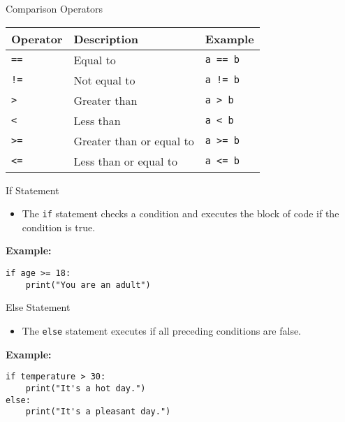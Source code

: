 \documentclass[serif, aspectratio=169]{beamer}
\begin{document}
\begin{frame}{Comparison Operators}
    \begin{tabular}{|l|l|l|}
        \hline
        \textbf{Operator} & \textbf{Description} & \textbf{Example} \\
        \hline
        \texttt{==} & Equal to & \texttt{a == b} \\
        \texttt{!=} & Not equal to & \texttt{a != b} \\
        \texttt{>} & Greater than & \texttt{a > b} \\
        \texttt{<} & Less than & \texttt{a < b} \\
        \texttt{>=} & Greater than or equal to & \texttt{a >= b} \\
        \texttt{<=} & Less than or equal to & \texttt{a <= b} \\
        \hline
    \end{tabular}
\end{frame}


\begin{frame}[fragile]{If Statement}
    \begin{itemize}[<+-| alert@+>] %
        \item The \texttt{if} statement checks a condition and executes the block of code if the condition is true.
    \end{itemize}
    \vspace{0.5cm}
    \textbf{Example:}
    \begin{verbatim}
if age >= 18:
    print("You are an adult")
    \end{verbatim}
\end{frame}

\begin{frame}[fragile]{Else Statement}
    \begin{itemize}[<+-| alert@+>] %
        \item The \texttt{else} statement executes if all preceding conditions are false.
    \end{itemize}
    \vspace{0.5cm}
    \textbf{Example:}
    \begin{verbatim}
if temperature > 30:
    print("It's a hot day.")
else:
    print("It's a pleasant day.")
    \end{verbatim}
\end{frame}
\end{document}
